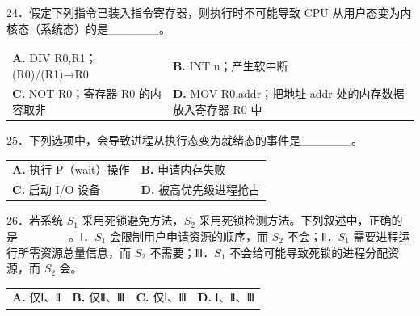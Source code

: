 \documentclass[UTF8,11pt]{ctexart}
\begin{document}
24．假定下列指令已装入指令寄存器，则执行时不可能导致 CPU 从用户态变为内核态（系统态）的是\_\_\_\_\_\_。


\begin{center}\begin{tabular}{>{\raggedright\arraybackslash}p{\dimexpr(\linewidth-4\tabcolsep)/2\relax}>{\raggedright\arraybackslash}p{\dimexpr(\linewidth-4\tabcolsep)/2\relax}}
\textbf{A.} DIV R0,R1；(R0)/(R1)→R0 & \textbf{B.} INT n；产生软中断\\[.35em]
\textbf{C.} NOT R0；寄存器 R0 的内容取非 & \textbf{D.} MOV R0,addr；把地址 addr 处的内存数据放入寄存器 R0 中\\[.35em]\end{tabular}\end{center}

25．下列选项中，会导致进程从执行态变为就绪态的事件是\_\_\_\_\_\_。


\begin{center}\begin{tabular}{>{\raggedright\arraybackslash}p{\dimexpr(\linewidth-4\tabcolsep)/2\relax}>{\raggedright\arraybackslash}p{\dimexpr(\linewidth-4\tabcolsep)/2\relax}}
\textbf{A.} 执行 P（wait）操作 & \textbf{B.} 申请内存失败\\[.35em]
\textbf{C.} 启动 I/O 设备 & \textbf{D.} 被高优先级进程抢占\\[.35em]\end{tabular}\end{center}

26．若系统 \(\displaystyle S_1\) 采用死锁避免方法，\(\displaystyle S_2\) 采用死锁检测方法。下列叙述中，正确的是\_\_\_\_\_\_。Ⅰ．\(\displaystyle S_1\) 会限制用户申请资源的顺序，而 \(\displaystyle S_2\) 不会；Ⅱ．\(\displaystyle S_1\) 需要进程运行所需资源总量信息，而 \(\displaystyle S_2\) 不需要；Ⅲ．\(\displaystyle S_1\) 不会给可能导致死锁的进程分配资源，而 \(\displaystyle S_2\) 会。


\begin{center}\begin{tabular}{>{\raggedright\arraybackslash}p{\dimexpr(\linewidth-8\tabcolsep)/4\relax}>{\raggedright\arraybackslash}p{\dimexpr(\linewidth-8\tabcolsep)/4\relax}>{\raggedright\arraybackslash}p{\dimexpr(\linewidth-8\tabcolsep)/4\relax}>{\raggedright\arraybackslash}p{\dimexpr(\linewidth-8\tabcolsep)/4\relax}}
\textbf{A.} 仅Ⅰ、Ⅱ & \textbf{B.} 仅Ⅱ、Ⅲ & \textbf{C.} 仅Ⅰ、Ⅲ & \textbf{D.} Ⅰ、Ⅱ、Ⅲ\\[.35em]\end{tabular}\end{center}
\end{document}
